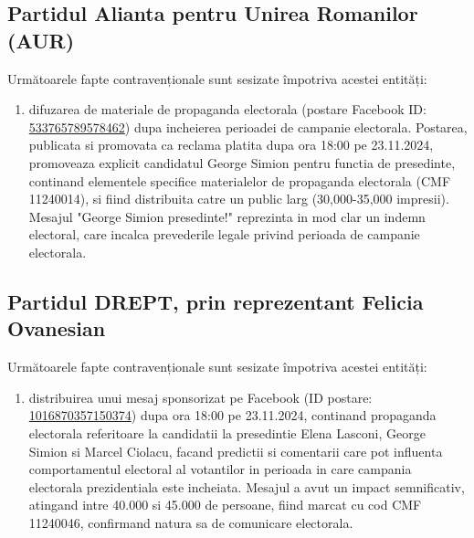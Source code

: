\documentclass[a4paper,12pt]{article}
\begin{document}
\subsection{Partidul Alianta pentru Unirea Romanilor (AUR)}
Următoarele fapte contravenționale sunt sesizate împotriva acestei entități:

\begin{enumerate}[leftmargin=*, label=\arabic*.)]
    \item difuzarea de materiale de propaganda electorala (postare Facebook ID: \href{https://www.facebook.com/ads/library/?id=533765789578462}{533765789578462}) dupa incheierea perioadei de campanie electorala. Postarea, publicata si promovata ca reclama platita dupa ora 18:00 pe 23.11.2024, promoveaza explicit candidatul George Simion pentru functia de presedinte, continand elementele specifice materialelor de propaganda electorala (CMF 11240014), si fiind distribuita catre un public larg (30,000-35,000 impresii). Mesajul "George Simion presedinte!" reprezinta in mod clar un indemn electoral, care incalca prevederile legale privind perioada de campanie electorala.
\end{enumerate}

\vspace{0.5cm}

\subsection{Partidul DREPT, prin reprezentant Felicia Ovanesian}
Următoarele fapte contravenționale sunt sesizate împotriva acestei entități:

\begin{enumerate}[leftmargin=*, label=\arabic*.)]
    \item distribuirea unui mesaj sponsorizat pe Facebook (ID postare: \href{https://www.facebook.com/ads/library/?id=1016870357150374}{1016870357150374}) dupa ora 18:00 pe 23.11.2024, continand propaganda electorala referitoare la candidatii la presedintie Elena Lasconi, George Simion si Marcel Ciolacu, facand predictii si comentarii care pot influenta comportamentul electoral al votantilor in perioada in care campania electorala prezidentiala este incheiata. Mesajul a avut un impact semnificativ, atingand intre 40.000 si 45.000 de persoane, fiind marcat cu cod CMF 11240046, confirmand natura sa de comunicare electorala.
\end{enumerate}

\vspace{0.5cm}
\end{document}
